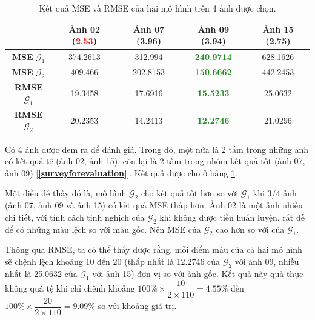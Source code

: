\documentclass[a4paper, 12pt]{report}
\begin{document}
\begin{table}[!h]
\centering
\begin{tabular}{c|c|c|c|c|}
\cline{2-5}
                                    & \textbf{Ảnh 02 (\textcolor{red}{\textbf{2.53}})}  & \textbf{Ảnh 07 (\textcolor{JungleGreen}{\textbf{3.96}})}  & \textbf{Ảnh 09 (\textcolor{JungleGreen}{\textbf{3.94}})}  & \textbf{Ảnh 15 (\textcolor{Mahogany}{\textbf{2.75}})}  \\ \hline
\multicolumn{1}{|c|}{\textbf{MSE} $\mathcal{G}_1$}  & 374.2613         & 312.994          & \textcolor{ForestGreen}{\textbf{240.9714}}         & 628.1626         \\ \hline
\multicolumn{1}{|c|}{\textbf{MSE} $\mathcal{G}_2$}  & 409.466          & 202.8153         & \textcolor{ForestGreen}{\textbf{150.6662}}         & 442.2453         \\ \hline
\multicolumn{1}{|c|}{\textbf{RMSE} $\mathcal{G}_1$} & 19.3458          & 17.6916          & \textcolor{ForestGreen}{\textbf{15.5233}}          & 25.0632          \\ \hline
\multicolumn{1}{|c|}{\textbf{RMSE} $\mathcal{G}_2$} & 20.2353          & 14.2413          & \textcolor{ForestGreen}{\textbf{12.2746}}          & 21.0296          \\ \hline
\end{tabular}
\caption{Kết quả MSE và RMSE của hai mô hình trên 4 ảnh được chọn.}
\label{tab:msermse}
\end{table}

Có 4 ảnh được đem ra để đánh giá.
Trong đó, một nửa là 2 tấm trong những ảnh có kết quả tệ (ảnh 02, ảnh 15), còn lại là 2 tấm trong nhóm kết quả tốt (ảnh 07, ảnh 09) [\textbf{\ref{surveyforevaluation}}].
Kết quả được cho ở bảng \ref{tab:msermse}.\vspace{5pt}

Một điều dễ thấy đó là, mô hình $\mathcal{G}_2$ cho kết quả tốt hơn so với $\mathcal{G}_1$ khi 3/4 ảnh (ảnh 07, ảnh 09 và ảnh 15) có kết quả MSE thấp hơn.
Ảnh 02 là một ảnh nhiều chi tiết, với tính cách tinh nghịch của $\mathcal{G}_2$ khi không được tiền huấn luyện, rất dễ để có những màu lệch so với màu gốc.
Nên MSE của $\mathcal{G}_2$ cao hơn so với của $\mathcal{G}_1$.\vspace{5pt}

Thông qua RMSE, ta có thể thấy được rằng, mỗi điểm màu của cả hai mô hình sẽ chệnh lệch khoảng 10 đến 20 (thấp nhất là 12.2746 của $\mathcal{G}_2$ với ảnh 09, nhiều nhất là 25.0632 của $\mathcal{G}_1$ với ảnh 15) đơn vị so với ảnh gốc.
Kết quả này quả thực không quá tệ khi chỉ chênh khoảng $100\% \times \dfrac{10}{2\times 110} = 4.55 \%$ đến $100\% \times \dfrac{20}{2\times 110} = 9.09 \%$ so với khoảng giá trị.
\end{document}
